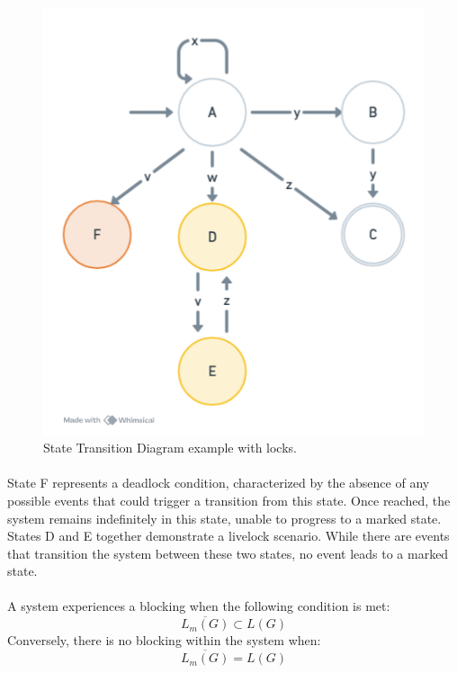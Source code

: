 \begin{figure}[H]
    \centering
    \includegraphics[width=0.5\linewidth]{figuras/automaton_lock.png}
    \caption{State Transition Diagram example with locks.}
    \label{fig:state_transition_diagram_example_with_lock}
\end{figure}

\paragraph{} State F represents a deadlock condition, characterized by the absence of any possible events that could trigger a transition from this state. Once reached, the system remains indefinitely in this state, unable to progress to a marked state. States D and E together demonstrate a livelock scenario. While there are events that transition the system between these two states, no event leads to a marked state.

\paragraph{} A system experiences a blocking when the following condition is met:
$$
\overline{L_m(G)} \subset L(G)
$$
\noindent
Conversely, there is no blocking within the system when:
$$
\overline{L_m(G)}=L(G)
$$



